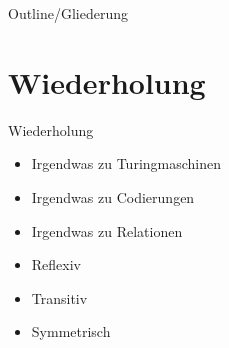 
\subtitle{Foliensatz 13}
\date{31. Januar 2013}

\newcommand{\sq}{$\square$}
\newcommand{\da}{$\downarrow$}



\begin{frame}
    \titlepage
\end{frame}

\begin{frame}{Outline/Gliederung}
    \tableofcontents
\end{frame}

\section{Wiederholung}
\begin{frame}{Wiederholung}
    \begin{itemize}
        \item Irgendwas zu Turingmaschinen
        \item Irgendwas zu Codierungen
        \item Irgendwas zu Relationen
        \item Reflexiv
        \item Transitiv
        \item Symmetrisch
    \end{itemize}
\end{frame}
